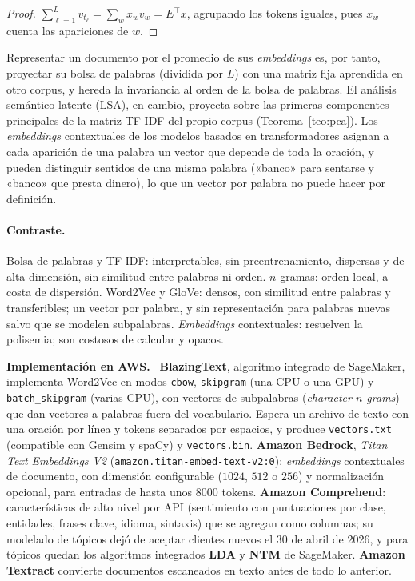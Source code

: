\documentclass[11pt,a4paper]{article}
\theoremstyle{plain}
\theoremstyle{definition}
\theoremstyle{remark}
\newcommand{\1}{\mathbf{1}}
\newenvironment{aws}{\par\medskip\sloppy\noindent\textbf{Implementación en AWS.}\ }{\par\medskip}
\begin{document}
\begin{proof}
$\sum_{\ell=1}^Lv_{t_\ell}=\sum_wx_wv_w=E^\top x$, agrupando los tokens
iguales, pues $x_w$ cuenta las apariciones de $w$.
\end{proof}

Representar un documento por el promedio de sus \emph{embeddings} es, por
tanto, proyectar su bolsa de palabras (dividida por $L$) con una matriz
fija aprendida en otro corpus, y hereda la invariancia al orden de la
bolsa de palabras. El análisis semántico latente (LSA), en cambio,
proyecta sobre las primeras componentes principales de la matriz TF-IDF del
propio corpus (Teorema~\ref{teo:pca}). Los \emph{embeddings} contextuales
de los modelos basados en transformadores asignan a cada aparición de una
palabra un vector que depende de toda la oración, y pueden distinguir
sentidos de una misma palabra («banco» para sentarse y «banco» que presta
dinero), lo que un vector por palabra no puede hacer por definición.

\paragraph{Contraste.} Bolsa de palabras y TF-IDF: interpretables, sin
preentrenamiento, dispersas y de alta dimensión, sin similitud entre
palabras ni orden. $n$-gramas: orden local, a costa de dispersión.
Word2Vec y GloVe: densos, con similitud entre palabras y transferibles; un
vector por palabra, y sin representación para palabras nuevas salvo que se
modelen subpalabras. \emph{Embeddings} contextuales: resuelven la
polisemia; son costosos de calcular y opacos.

\begin{aws}
\textbf{BlazingText}, algoritmo integrado de SageMaker, implementa
Word2Vec en modos \texttt{cbow}, \texttt{skipgram} (una CPU o una GPU) y
\texttt{batch\_skipgram} (varias CPU), con vectores de subpalabras
(\emph{character $n$-grams}) que dan vectores a palabras fuera del
vocabulario. Espera un archivo de texto con una oración por línea y tokens
separados por espacios, y produce \texttt{vectors.txt} (compatible con
Gensim y spaCy) y \texttt{vectors.bin}. \textbf{Amazon Bedrock},
\emph{Titan Text Embeddings V2} (\texttt{amazon.titan-embed-text-v2:0}):
\emph{embeddings} contextuales de documento, con dimensión configurable
($1024$, $512$ o $256$) y normalización opcional, para entradas de hasta
unos $8000$ tokens. \textbf{Amazon Comprehend}: características de alto
nivel por API (sentimiento con puntuaciones por clase, entidades, frases
clave, idioma, sintaxis) que se agregan como columnas; su modelado de
tópicos dejó de aceptar clientes nuevos el 30 de abril de 2026, y para
tópicos quedan los algoritmos integrados \textbf{LDA} y \textbf{NTM} de
SageMaker. \textbf{Amazon Textract} convierte documentos escaneados en
texto antes de todo lo anterior.
\end{aws}
\end{document}
